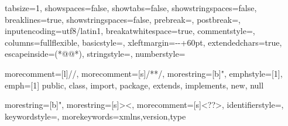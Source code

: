 \renewcommand*{\thelstnumber}{\protect\BeginAccSupp{ActualText={}}{\arabic{lstnumber}}\protect\EndAccSupp{}}
\makeatletter
\patchcmd{\lst@GLI@}%
{\def\lst@firstline{#1\relax}}%
{\def\lst@firstline{#1\relax}\def\lst@firstnumber{#1\relax}}%
{}%
{}%
\makeatother




\color{bookColor}

\lstset
{
	tabsize=1,
	showspaces=false,
	showtabs=false,
	showstringspaces=false,
	breaklines=true,
	showstringspaces=false,
	prebreak=\mbox{\textcolor{red}{\space}},
	postbreak=\mbox{\textcolor{red}{\space}},
	inputencoding=utf8/latin1,
	breakatwhitespace=true,
	commentstyle=\color{greencomments},
	columns=fullflexible,
	basicstyle=\ttfamily\small,
	xleftmargin=\dimexpr-\leftmarginii-\leftmargini+60pt,
	extendedchars=true,
	escapeinside={(*@}{@*)},
	stringstyle=\color{orangestrings},
	numberstyle=\hypertarget{\lstname\arabic{lstnumber}}{\tiny\color{black}}
}

{
	morecomment=[l]{//},
	morecomment=[s]{/*}{*/},
	morestring=[b]{"},
	emphstyle=[1]\color{pblue},
	emph=[1]
	{ 	
		public, class, import,
		package, extends, implements,
		new, null 
	}
}

{
	morestring=[b]",
	morestring=[s]{>}{<},
	morecomment=[s]{<?}{?>},
	identifierstyle=\color{darkblue},
	keywordstyle=\color{cyan},
	morekeywords={xmlns,version,type}
}

